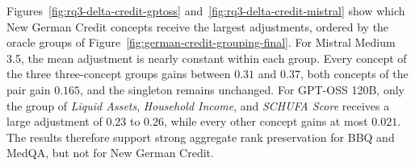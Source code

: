 Figures~\ref{fig:rq3-delta-credit-gptoss} and~\ref{fig:rq3-delta-credit-mistral} show which New German Credit concepts receive the largest adjustments, ordered by the oracle groups of Figure~\ref{fig:german-credit-grouping-final}. For Mistral Medium 3.5, the mean adjustment is nearly constant within each group. Every concept of the three three-concept groups gains between $0.31$ and $0.37$, both concepts of the pair gain $0.165$, and the singleton remains unchanged. For GPT-OSS 120B, only the group of \textit{Liquid Assets}, \textit{Household Income}, and \textit{SCHUFA Score} receives a large adjustment of $0.23$ to $0.26$, while every other concept gains at most $0.021$. The results therefore support strong aggregate rank preservation for BBQ and MedQA, but not for New German Credit.
